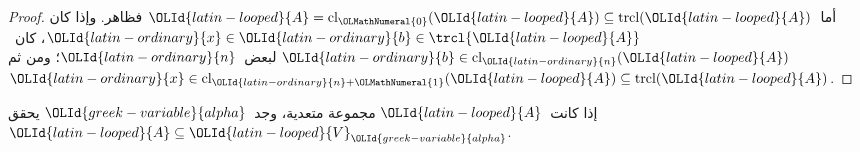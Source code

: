 \documentclass[../../../include/open-logic-section]{subfiles}
\begin{document}
\begin{proof}
أما~${\OLId{latin-looped}{A}} = \text{cl}_{\OLMathNumeral{0}}({\OLId{latin-looped}{A}}) \subseteq \text{trcl}({\OLId{latin-looped}{A}})$ فظاهر. وإذا كان
${\OLId{latin-ordinary}{x}} \in {\OLId{latin-ordinary}{b}} \in \trcl{{\OLId{latin-looped}{A}}}$، كان~${\OLId{latin-ordinary}{b}} \in \text{cl}_{\OLId{latin-ordinary}{n}}({\OLId{latin-looped}{A}})$ لبعض~${\OLId{latin-ordinary}{n}}$؛ ومن ثم
${\OLId{latin-ordinary}{x}} \in \text{cl}_{{\OLId{latin-ordinary}{n}}+{\OLMathNumeral{1}}}({\OLId{latin-looped}{A}}) \subseteq \text{trcl}({\OLId{latin-looped}{A}})$.
\end{proof}

\begin{lem}
إذا كانت~${\OLId{latin-looped}{A}}$ مجموعة متعدية، وجد~${\OLId{greek-variable}{alpha}}$ يحقق
${\OLId{latin-looped}{A}} \subseteq {\OLId{latin-looped}{V}}_{\OLId{greek-variable}{alpha}}$.
\end{lem}
\end{document}
